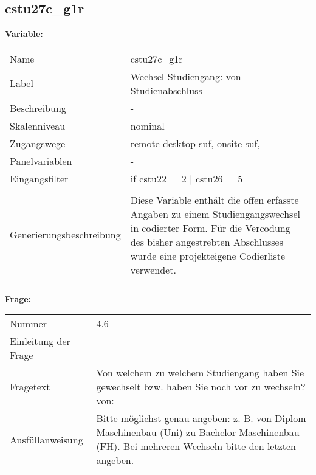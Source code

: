 	
	
	\subsection{cstu27c\_g1r}
	\label{subSection:cstu27c_g1r}

	\noindent\textbf{Variable:}\\
		\begin{tabular}{lL{11.3cm}}
			\label{tableVariable:cstu27c_g1r}
			Name & cstu27c\_g1r \\
			Label & Wechsel Studiengang: von Studienabschluss \\
			Beschreibung & - \\
			Skalenniveau & nominal \\
			Zugangswege &
				remote-desktop-suf,
				onsite-suf,
 \\
			Panelvariablen & -
			 \\
			Eingangsfilter & if cstu22==2 | cstu26==5 \\
 \\
					Generierungsbeschreibung & Diese Variable enthält die offen erfasste Angaben zu einem Studiengangswechsel in codierter Form. Für die Vercodung des bisher angestrebten Abschlusses wurde eine projekteigene Codierliste verwendet.
				 \\	
			 \\
		\end{tabular}

		\vspace*{1 cm}
		\noindent\textbf{Frage:}\\
		\begin{tabular}{lL{11.3cm}}
			\label{tableQuestion:cstu27c_g1r}
			Nummer & 4.6 \\
			Einleitung der Frage & - \\
			Fragetext & Von welchem zu welchem Studiengang haben Sie gewechselt bzw. haben Sie noch vor zu wechseln?
von: \\
			Ausfüllanweisung & Bitte möglichst genau angeben: z. B. von Diplom Maschinenbau
(Uni) zu Bachelor Maschinenbau (FH).
Bei mehreren Wechseln bitte den letzten angeben. \\
		\end{tabular}





